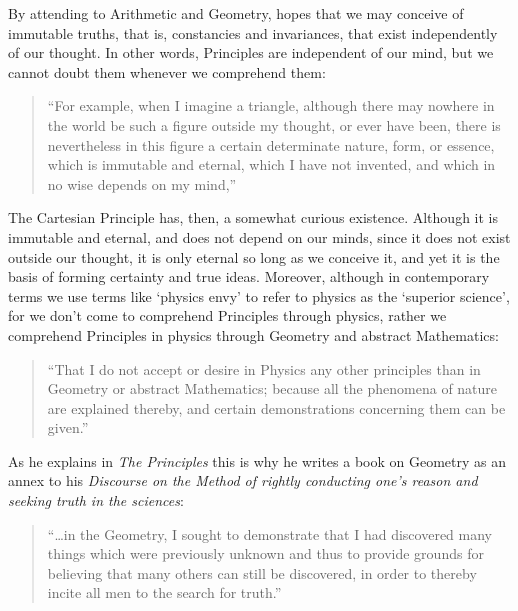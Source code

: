 \documentclass[a4paper, 12pt]{article}
\begin{document}
By attending to Arithmetic and Geometry, \citeauthor{descartes_principles_1982} hopes that we may conceive of immutable truths, that is, constancies and invariances, that exist independently of our thought. In other words, Principles are independent of our mind, but we cannot doubt them whenever we comprehend them:

\begin{quotation}
    ``For example, when I imagine a triangle, although there may nowhere in the world be such a figure outside my thought, or ever have been, there is nevertheless in this figure a certain determinate nature, form, or essence, which is immutable and eternal, which I have not invented, and which in no wise depends on my mind,'' \citep[p.~180]{descartes_philosophical_1911}
\end{quotation}

The Cartesian Principle has, then, a somewhat curious existence. Although it is immutable and eternal, and does not depend on our minds, since it does not exist outside our thought, it is only eternal so long as we conceive it, and yet it is the basis of forming certainty and true ideas. Moreover, although in contemporary terms we use terms like `physics envy' to refer to physics as the `superior science', for \citeauthor{descartes_principles_1982} we don't come to comprehend Principles through physics, rather we comprehend Principles in physics through Geometry and abstract Mathematics:

\begin{quotation}
    ``That I do not accept or desire in Physics any other principles than in Geometry or abstract Mathematics; because all the phenomena of nature are explained thereby, and certain demonstrations concerning them can be given.'' \citep[\S~64, p.~76]{descartes_principles_1982}
\end{quotation}

As he explains in \textit{The Principles} this is why he writes a book on Geometry as an annex to his \textit{Discourse on the Method of rightly conducting one's reason and seeking truth in the sciences}:

\begin{quotation}
    ``\dots in the Geometry, I sought to demonstrate that I had discovered many things which were previously unknown and thus to provide grounds for believing that many others can still be discovered, in order to thereby incite all men to the search for truth.'' \citep[p.~xxv]{descartes_principles_1982}    
\end{quotation}
\end{document}
